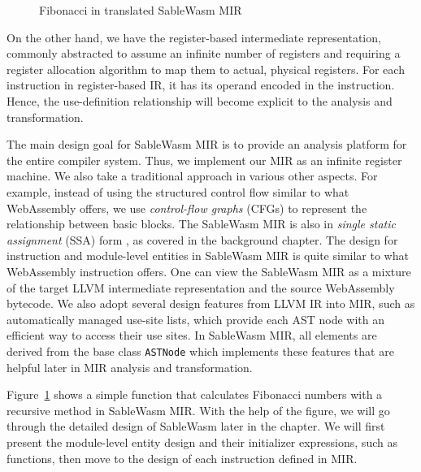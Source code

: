 \begin{figure}
    \centering
    
    \caption{Fibonacci in translated SableWasm MIR}
    \label{fig:mir-fibonacci}
\end{figure}

On the other hand, we have the register-based intermediate representation,
commonly abstracted to assume an infinite number of registers and requiring a
register allocation algorithm to map them to actual, physical registers. For
each instruction in register-based IR, it has its operand encoded in the
instruction. Hence, the use-definition relationship will become explicit to the
analysis and transformation.

The main design goal for SableWasm MIR is to provide an analysis platform for
the entire compiler system. Thus, we implement our MIR as an infinite register
machine. We also take a traditional approach in various other aspects. For
example, instead of using the structured control flow similar to what
WebAssembly offers, we use \emph{control-flow graphs} (CFGs) to represent the
relationship between basic blocks. The SableWasm MIR is also in
\emph{single static assignment} (SSA) form \cite{ibm-ssa}, as covered in the
background chapter. The design for instruction and module-level entities in
SableWasm MIR is quite similar to what WebAssembly instruction offers. One can
view the SableWasm MIR as a mixture of the target LLVM intermediate
representation and the source WebAssembly bytecode. We also adopt several design
features from LLVM IR into MIR, such as automatically managed use-site lists,
which provide each AST node with an efficient way to access their use sites.
In SableWasm MIR, all elements are derived from the base class \texttt{ASTNode}
which implements these features that are helpful later in MIR analysis and
transformation.

Figure~\ref{fig:mir-fibonacci} shows a simple function that calculates Fibonacci
numbers with a recursive method in SableWasm MIR. With the help of the figure,
we will go through the detailed design of SableWasm later in the chapter. We
will first present the module-level entity design and their initializer
expressions, such as functions, then move to the design of each instruction
defined in MIR.





